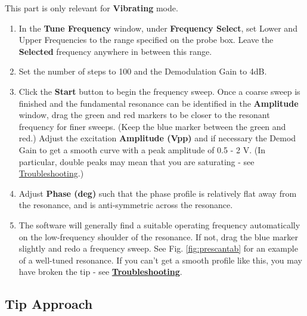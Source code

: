 \documentclass{../lab}
\begin{document}
This part is only relevant for \textbf{Vibrating} mode. 

\begin{enumerate}
    \item In the \textbf{Tune Frequency} window, under \textbf{Frequency Select}, set Lower and Upper Frequencies to the range specified on the probe box. Leave the \textbf{Selected }frequency anywhere in between this range.
    
    \item Set the number of steps to 100 and the Demodulation Gain to 4dB.
    
    \item Click the \textbf{Start} button to begin the frequency sweep. Once a coarse sweep is finished and the fundamental resonance can be identified in the \textbf{Amplitude} window, drag the green and red markers to be closer to the resonant frequency for finer sweeps. (Keep the blue marker between the green and red.) Adjust the excitation \textbf{Amplitude (Vpp)} and if necessary the Demod Gain to get a smooth curve with a peak amplitude of 0.5 - 2 V. (In particular, double peaks may mean that you are saturating - see \hyperref[subsec:Troubleshooting]{Troubleshooting}.)
    
    \item Adjust \textbf{Phase (deg)} such that the phase profile is relatively flat away from the resonance, and is anti-symmetric across the resonance.
    
    \item The software will generally find a suitable operating frequency automatically on the low-frequency shoulder of the resonance. If not, drag the blue marker slightly and redo a frequency sweep. See Fig. \ref{fig:prescantab} for an example of a well-tuned resonance. If you can't get a smooth profile like this, you may have broken the tip - see \hyperref[sec:Troubleshooting]{\textbf{Troubleshooting}}.

\end{enumerate}


\subsection{Tip Approach}
\label{subsec:TipApproach}
\end{document}
